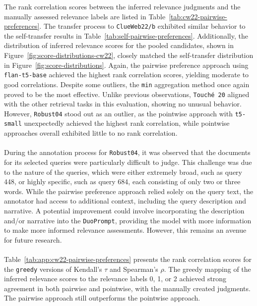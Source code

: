 The rank correlation scores between the inferred relevance judgments and the manually assessed relevance labels are listed in Table~\ref{tab:cw22-pairwise-preferences}. The transfer process to \texttt{ClueWeb22/b} exhibited similar behavior to the self-transfer results in \mbox{Table~\ref{tab:self-pairwise-preferences}}. Additionally, the distribution of inferred relevance scores for the pooled candidates, shown in Figure~\ref{fig:score-distributions-cw22}, closely matched the self-transfer distribution in Figure~\ref{fig:score-distributions}. Again, the pairwise preference approach using \texttt{flan-t5-base} achieved the highest rank correlation scores, yielding moderate to good correlations. Despite some outliers, the \texttt{min} aggregation method once again proved to be the most effective. Unlike previous observations, \mbox{\texttt{Touché 20}} aligned with the other retrieval tasks in this evaluation, showing no unusual behavior. However, \texttt{Robust04} stood out as an outlier, as the pointwise approach with \texttt{t5-small} unexpectedly achieved the highest rank correlation, while pointwise approaches overall exhibited little to no rank correlation.
\\\\
During the annotation process for \texttt{Robust04}, it was observed that the documents for its selected queries were particularly difficult to judge. This challenge was due to the nature of the queries, which were either extremely broad, such as query 448, or highly specific, such as query 684, each consisting of only two or three words. While the pairwise preference approach relied solely on the query text, the annotator had access to additional context, including the query description and narrative. A potential improvement could involve incorporating the description and/or narrative into the \texttt{DuoPrompt}, providing the model with more information to make more informed relevance assessments. However, this remains an avenue for future research.
\\\\
Table~\ref{tab:app:cw22-pairwise-preferences} presents the rank correlation scores for the \texttt{greedy} versions of Kendall's $\tau$ and Spearman's $\rho$. The greedy mapping of the inferred relevance scores to the relevance labels 0, 1, or 2 achieved strong agreement in both pairwise and pointwise, with the manually created judgments. The pairwise approach still outperforms the pointwise approach.

